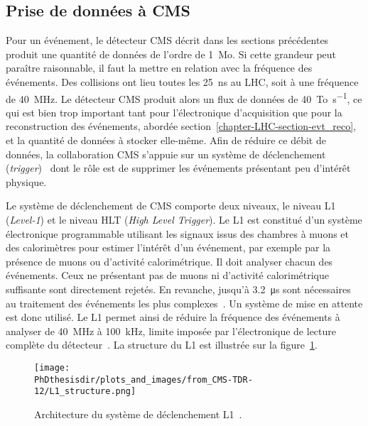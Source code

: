 \subsection{Prise de données à CMS}\label{chapter-LHC-section-CMS-subsec-data_taking}
Pour un événement, le détecteur CMS décrit dans les sections précédentes produit une quantité de données de l'ordre de \SI{1}{\mega o}.
Si cette grandeur peut paraître raisonnable, il faut la mettre en relation avec la fréquence des événements.
Des collisions ont lieu toutes les \SI{25}{\nano\second} au LHC, soit à une fréquence de \SI{40}{\mega\hertz}.
Le détecteur CMS produit alors un flux de données de \SI{40}{\tera o.\second^{-1}}, ce qui est bien trop important tant pour l'électronique d'acquisition que pour la reconstruction des événements, abordée section~\ref{chapter-LHC-section-evt_reco}, et la quantité de données à stocker elle-même.
Afin de réduire ce débit de données, la collaboration CMS s'appuie sur un système de déclenchement (\emph{trigger})~\cite{cms_paper,CERN-LHCC-2000-038,CERN-LHCC-2002-026,CMS-TRG-12-001,CMS-TDR-12} dont le rôle est de supprimer les événements présentant peu d'intérêt physique.
\par Le système de déclenchement de CMS comporte deux niveaux, le niveau \og L1 \fg{} (\emph{Level-1}) et le niveau \og HLT \fg{} (\emph{High Level Trigger}).
Le L1 est constitué d'un système électronique programmable utilisant les signaux issus des chambres à muons et des calorimètres pour estimer l'intérêt d'un événement, par exemple par la présence de muons ou d'activité calorimétrique.
Il doit analyser chacun des événements.
Ceux ne présentant pas de muons ni d'activité calorimétrique suffisante sont directement rejetés.
En revanche, jusqu'à \SI{3.2}{\micro\second} sont nécessaires au traitement des événements les plus complexes~\cite{cms_paper}.
Un système de mise en attente est donc utilisé.
Le L1 permet ainsi de réduire la fréquence des événements à analyser de \SI{40}{\mega\hertz} à \SI{100}{\kilo\hertz}, limite imposée par l'électronique de lecture complète du détecteur~\cite{CMS-TRG-12-001}.
La structure du L1 est illustrée sur la figure~\ref{fig-chapter-LHC-section-CMS-subsec-data_taking-cms_paper-fig_8-1}.
\begin{figure}[h]
\centering
\texttt{[image: \\PhDthesisdir/plots\_and\_images/from\_CMS-TDR-12/L1\_structure.png]}
\caption[Architecture du système de déclenchement L1.]{Architecture du système de déclenchement L1~\cite{CMS-TDR-12}.}
\label{fig-chapter-LHC-section-CMS-subsec-data_taking-cms_paper-fig_8-1}
\end{figure}
